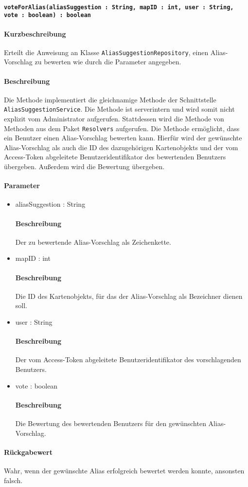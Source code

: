 \paragraph*{\texttt{voteForAlias(aliasSuggestion : String, mapID : int, user : String, vote : boolean) : boolean}}%
\paragraph*{Kurzbeschreibung}
Erteilt die Anweisung an Klasse \texttt{AliasSuggestionRepository}, einen Alias-Vorschlag zu bewerten wie durch die Parameter angegeben.
\paragraph*{Beschreibung}
Die Methode implementiert die gleichnamige Methode der Schnittstelle \texttt{AliasSuggestionService}.
Die Methode ist serverintern und wird somit nicht explizit vom Administrator aufgerufen.
Stattdessen wird die Methode von Methoden aus dem Paket \texttt{Resolvers} aufgerufen.
Die Methode ermöglicht, dass ein Benutzer einen Alias-Vorschlag bewerten kann. 
Hierfür wird der gewünschte Alias-Vorschlag als auch die ID des dazugehörigen Kartenobjekts und der vom Access-Token abgeleitete Benutzeridentifikator des bewertenden Benutzers übergeben.
Außerdem wird die Bewertung übergeben.
\paragraph*{Parameter}
\begin{itemize}
	\item aliasSuggestion : String
		\paragraph*{Beschreibung}
		Der zu bewertende Alias-Vorschlag als Zeichenkette.
	\item mapID : int
		\paragraph*{Beschreibung}
		Die ID des Kartenobjekts, für das der Alias-Vorschlag als Bezeichner dienen soll.
	\item user : String
		\paragraph*{Beschreibung}
		Der vom Access-Token abgeleitete Benutzeridentifikator des vorschlagenden Benutzers.
	\item vote : boolean
		\paragraph*{Beschreibung}
		Die Bewertung des bewertenden Benutzers für den gewünschten Alias-Vorschlag.
\end{itemize}
\paragraph*{Rückgabewert}
Wahr, wenn der gewünschte Alias erfolgreich bewertet werden konnte, ansonsten falsch.
